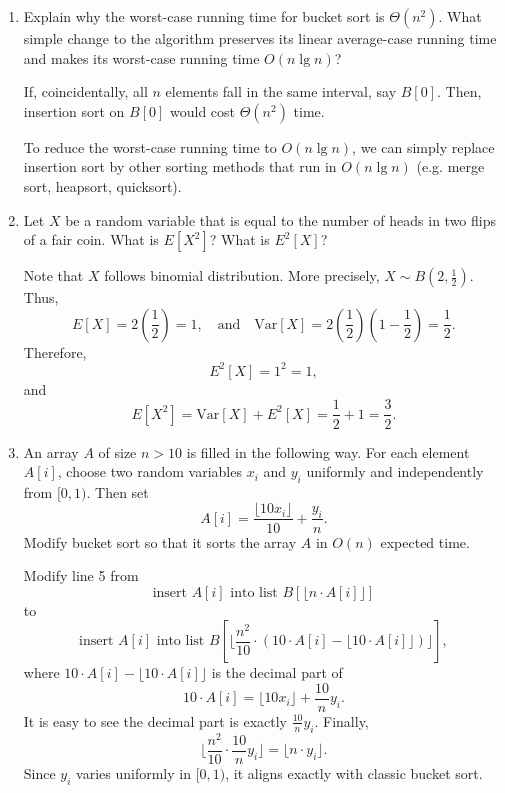 \documentclass[12pt,reqno]{amsart}
\newif\ifanswer
\begin{document}
\begin{enumerate}[1.]
\item Explain why the worst-case running time for bucket sort is $\Theta(n^2)$. What simple change to the algorithm preserves its linear average-case running time and makes its worst-case running time $O(n\lg{n})$?
\vspace{0.5cm}

\ifanswer
{}

If, coincidentally, all $n$ elements fall in the same interval, say $B[0]$. Then, insertion sort on $B[0]$ would cost $\Theta(n^2)$ time.

To reduce the worst-case running time to $O(n\lg{n})$, we can simply replace insertion sort by other sorting methods that run in $O(n\lg{n})$ (e.g. merge sort, heapsort, quicksort).

\vspace{1cm}



\item Let $X$ be a random variable that is equal to the number of heads in two flips of a fair coin. What is $E[X^2]$? What is $E^2[X]$?
\vspace{0.5cm}

\ifanswer
{}

Note that $X$ follows binomial distribution. More precisely, $X \sim B(2, \frac{1}{2})$. Thus, $$ E[X] = 2\left(\frac{1}{2}\right) = 1, \quad\text{and}\quad \text{Var}[X] = 2\left(\frac{1}{2}\right)\left(1 - \frac{1}{2}\right) = \frac{1}{2}. $$ Therefore, $$ E^2[X] = 1^2 = 1, $$ and $$ E[X^2] = \text{Var}[X] + E^2[X] = \frac{1}{2} + 1 = \frac{3}{2}. $$

\vspace{1cm}



\item An array $A$ of size $n > 10$ is filled in the following way. For each element $A[i]$, choose two random variables $x_i$ and $y_i$ uniformly and independently from $[0, 1)$. Then set $$ A[i] = \frac{\lfloor 10x_i \rfloor}{10} + \frac{y_i}{n}. $$ Modify bucket sort so that it sorts the array $A$ in $O(n)$ expected time.
\vspace{0.5cm}

\ifanswer
{}

Modify line 5 from $$\text{insert $A[i]$ into list $B[\lfloor n \cdot A[i] \rfloor]$}$$ to $$\text{insert $A[i]$ into list $B[\lfloor \frac{n^2}{10} \cdot \left(10 \cdot A[i] - \lfloor 10 \cdot A[i] \rfloor\right) \rfloor]$},$$ where $10 \cdot A[i] - \lfloor 10 \cdot A[i] \rfloor$ is the decimal part of $$10 \cdot A[i] = \lfloor 10x_i \rfloor + \frac{10}{n}y_i.$$ It is easy to see the decimal part is exactly $\frac{10}{n}y_i$. Finally, $$\lfloor \frac{n^2}{10} \cdot \frac{10}{n}y_i \rfloor = \lfloor n \cdot y_i \rfloor.$$ Since $y_i$ varies uniformly in $[0, 1)$, it aligns exactly with classic bucket sort.
\vspace{1cm}




\end{enumerate}
\end{document}
